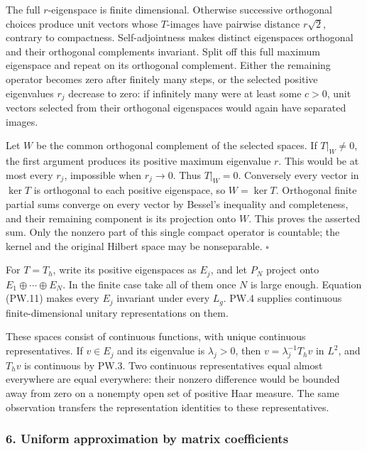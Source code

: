 \documentclass[
  11pt,
]{article}
\begin{document}
The full \(r\)-eigenspace is finite dimensional. Otherwise successive
orthogonal choices produce unit vectors whose \(T\)-images have pairwise
distance \(r\sqrt2\), contrary to compactness. Self-adjointness makes
distinct eigenspaces orthogonal and their orthogonal complements
invariant. Split off this full maximum eigenspace and repeat on its
orthogonal complement. Either the remaining operator becomes zero after
finitely many steps, or the selected positive eigenvalues \(r_j\)
decrease to zero: if infinitely many were at least some \(c>0\), unit
vectors selected from their orthogonal eigenspaces would again have
separated images.

Let \(W\) be the common orthogonal complement of the selected spaces. If
\(T|_W\ne0\), the first argument produces its positive maximum
eigenvalue \(r\). This would be at most every \(r_j\), impossible when
\(r_j\to0\). Thus \(T|_W=0\). Conversely every vector in \(\ker T\) is
orthogonal to each positive eigenspace, so \(W=\ker T\). Orthogonal
finite partial sums converge on every vector by Bessel's inequality and
completeness, and their remaining component is its projection onto
\(W\). This proves the asserted sum. Only the nonzero part of this
single compact operator is countable; the kernel and the original
Hilbert space may be nonseparable. \(\square\)

For \(T=T_h\), write its positive eigenspaces as \(E_j\), and let
\(P_N\) project onto \(E_1\oplus\cdots\oplus E_N\). In the finite case
take all of them once \(N\) is large enough. Equation (PW.11) makes
every \(E_j\) invariant under every \(L_g\). PW.4 supplies continuous
finite-dimensional unitary representations on them.

These spaces consist of continuous functions, with unique continuous
representatives. If \(v\in E_j\) and its eigenvalue is \(\lambda_j>0\),
then \(v=\lambda_j^{-1}T_hv\) in \(L^2\), and \(T_hv\) is continuous by
PW.3. Two continuous representatives equal almost everywhere are equal
everywhere: their nonzero difference would be bounded away from zero on
a nonempty open set of positive Haar measure. The same observation
transfers the representation identities to these representatives.

\subsubsection{6. Uniform approximation by matrix
coefficients}\label{uniform-approximation-by-matrix-coefficients}
\end{document}
